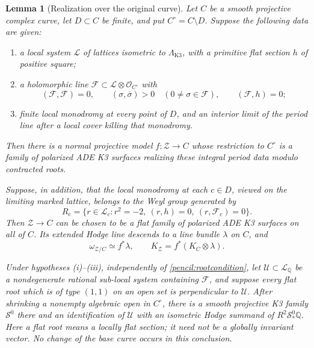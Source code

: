 \documentclass[11pt]{amsart}
\newcommand{\Q}{\mathbb Q}
\newtheorem{lemma}[theorem]{Lemma}
\theoremstyle{definition}
\theoremstyle{remark}
\numberwithin{equation}{section}
\begin{document}
\begin{lemma}[Realization over the original curve]
\label{pencil:descent}
Let \(C\) be a smooth projective complex curve, let \(D\subset C\) be
finite, and put \(C^\circ=C\setminus D\).  Suppose the following data are
given:
\begin{enumerate}[label=\textup{(\roman*)}]
\item a local system \(\mathcal L\) of lattices isometric to
\(\Lambda_{\mathrm{K3}}\), with a primitive flat section \(h\) of positive square;
\item a holomorphic line \(\mathcal F\subset\mathcal L\otimes\mathcal O_{C^\circ}\)
with
\[
 (\mathcal F,\mathcal F)=0,\qquad
 (\sigma,\overline\sigma)>0\quad(0\ne\sigma\in\mathcal F),\qquad
 (\mathcal F,h)=0;
\]
\item finite local monodromy at every point of \(D\), and an interior
limit of the period line after a local cover killing that monodromy.
\end{enumerate}
Then there is a normal projective model \(f:\mathcal Z\to C\) whose
restriction to \(C^\circ\) is a family of polarized ADE K3 surfaces
realizing these integral period data modulo contracted roots.

Suppose, in addition, that the local monodromy at each \(c\in D\), viewed
on the limiting marked lattice, belongs to the Weyl group generated by
\[
 R_c=\{r\in\mathcal L_c:r^2=-2,\ (r,h)=0,\ (r,\mathcal F_c)=0\}.
 \tag{\(*\)}\label{pencil:rootcondition}
\]
Then \(\mathcal Z\to C\) can be chosen to be a flat family of polarized
ADE K3 surfaces on all of \(C\).  Its extended Hodge line descends to a
line bundle \(\lambda\) on \(C\), and
\begin{equation}
 \omega_{\mathcal Z/C}\simeq f^*\lambda,
 \qquad K_{\mathcal Z}=f^*(K_C\otimes\lambda).
 \label{pencil:canonical}
\end{equation}

Under hypotheses \textup{(i)}--\textup{(iii)}, independently of
\eqref{pencil:rootcondition}, let
\(\mathcal U\subset\mathcal L_\Q\) be a nondegenerate rational
sub-local system containing \(\mathcal F\), and suppose every flat root
which is of type \((1,1)\) on an open set is perpendicular to \(\mathcal U\).
After shrinking a nonempty algebraic open in \(C^\circ\), there is a
smooth projective K3 family \(\mathcal S^0\) there and an identification
of \(\mathcal U\) with an isometric Hodge summand of
\(R^2\mathcal S^0_*\Q\).  Here a flat root means a locally flat
section; it need not be a globally invariant vector.  No change of the
base curve occurs in this conclusion.
\end{lemma}
\end{document}
